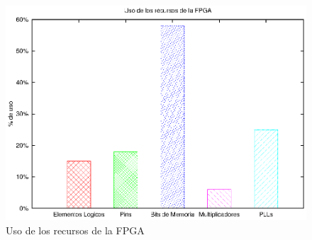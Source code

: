 \begin{figure}[H]
  \centering
	\includegraphics[scale=0.70]{4-implementacion/graf/fpga.eps}
  \caption{Uso de los recursos de la FPGA}
  \label{fig:fpga}
\end{figure}


